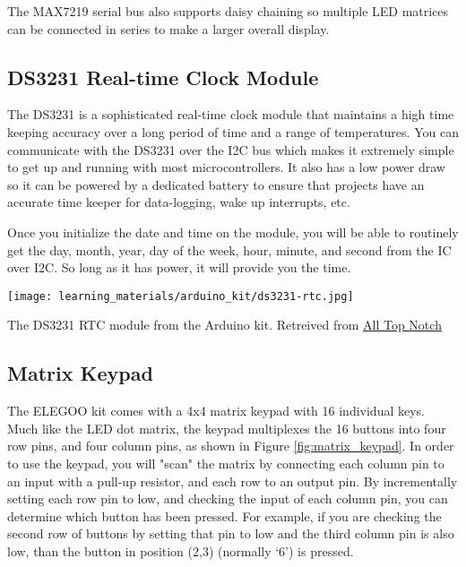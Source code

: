     The MAX7219 serial bus also supports daisy chaining so multiple LED matrices can be connected in series to make a larger overall display.

    \subsection*{DS3231 Real-time Clock Module}
    The DS3231 is a sophisticated real-time clock module that maintains a high time keeping accuracy over a long period of time and a range of temperatures.
    You can communicate with the DS3231 over the I2C bus which makes it extremely simple to get up and running with most microcontrollers.
    It also has a low power draw so it can be powered by a dedicated battery to ensure that projects have an accurate time keeper for data-logging, wake up interrupts, etc.

    Once you initialize the date and time on the module, you will be able to routinely get the day, month, year, day of the week, hour, minute, and second from the IC over I2C. So long as it has power, it will provide you the time.

    \begin{marginfigure}[-2in]
        \texttt{[image: learning\_materials/arduino\_kit/ds3231-rtc.jpg]}
        \caption[DS3231 RTC Module]{The DS3231 RTC module from the Arduino kit. 
        Retreived from \href{https://alltopnotch.co.uk/wp-content/uploads/imported/9/RTC-Real-Time-Clock-DS3231-I2C-AT24C32-Board-Module-Arduino-ARM-PIC-UK-Seller-361515587149-4.JPG}
        {All Top Notch}}
    \end{marginfigure}

    \subsection*{Matrix Keypad}
    The ELEGOO kit comes with a 4x4 matrix keypad with 16 individual keys.
    Much like the LED dot matrix, the keypad multiplexes the 16 buttons into four row pins, and four column pins, as shown in Figure \ref{fig:matrix_keypad}.
    In order to use the keypad, you will "scan" the matrix by connecting each column pin to an input with a pull-up resistor, and each row to an output pin.
    By incrementally setting each row pin to low, and checking the input of each column pin, you can determine which button has been pressed.
    For example, if you are checking the second row of buttons by setting that pin to low and the third column pin is also low, than the button in position (2,3) (normally `6') is pressed.

